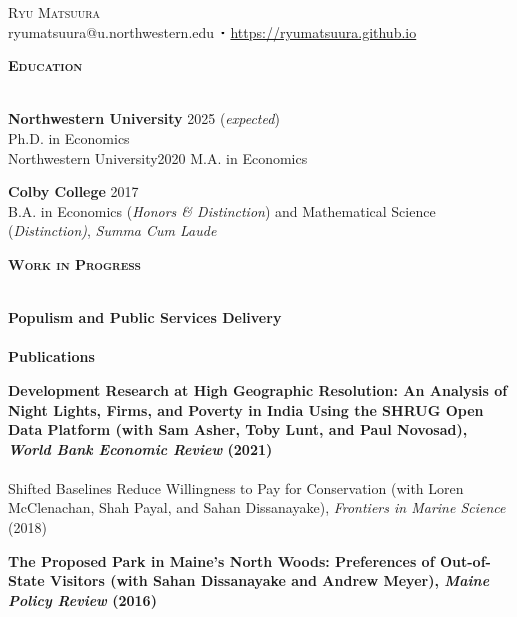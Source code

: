 \documentclass[11pt]{article}
\newcommand{\lineunder}{\vspace*{-8pt} \\ \hspace*{-18pt} \hrulefill \\}
\newcommand{\header}[1]{{\hspace*{-15pt}\vspace*{6pt} \textsc{#1}} \vspace*{-6pt} \lineunder}
\newcommand{\contact}[2]{
\begin{center}
{\LARGE \scshape {#1}}\\
#2
\end{center}
\vspace*{-8pt}
}
\newcommand{\sbt}{\,\begin{picture}(-1,1)(-1,-3)\circle*{2}\end{picture}\ }
\newcommand{\schoolwithcourses}[4]{
 \textbf{#1} \hfill{#2}\\
    #3\\
\vspace*{5pt}
}
\begin{document}

\small
\smallskip
\vspace*{-35pt}

\contact{Ryu Matsuura}
{ryumatsuura@u.northwestern.edu $\sbt$ \url{https://ryumatsuura.github.io}}


\header{\textbf{Education}}
\vspace{2mm}
\schoolwithcourses{Northwestern University}{2025 (\textit{expected})}{\hspace{2mm} Ph.D. in Economics}

\schoolwithcourses{Northwestern University}{2020}{\hspace{2mm} M.A. in Economics}

\schoolwithcourses{Colby College}{2017}{\hspace{2mm} B.A. in Economics (\textit{Honors \& Distinction}) and Mathematical Science (\textit{Distinction)}, \textit{Summa Cum Laude}}
\hfill{}
\vspace{3mm}


\header{\textbf{Work in Progress}}
\vspace{2mm}
\schoolwithcourses{Populism and Public Services Delivery}{}{~\vspace{0mm}}  



\header{\textbf{Publications}}
\vspace{2mm}
\schoolwithcourses{Development Research at High Geographic Resolution: An Analysis of Night Lights, Firms, and Poverty in India Using the SHRUG Open Data Platform \textnormal{(with Sam Asher, Toby Lunt, and Paul Novosad), \textit{World Bank Economic Review} (2021)}}{}{~\vspace{-3mm}}  

\schoolwithcourses{Shifted Baselines Reduce Willingness to Pay for Conservation \textnormal{(with Loren McClenachan,
Shah Payal, and Sahan Dissanayake), \textit{Frontiers in Marine Science} (2018)}}{}{~\vspace{-3mm}} 

\schoolwithcourses{The Proposed Park in Maine's North Woods: Preferences of Out-of-State Visitors \textnormal{(with Sahan Dissanayake and Andrew Meyer), \textit{Maine Policy Review} (2016)}}{}{~\vspace{0mm}} 
\hfill{}
\end{document}
